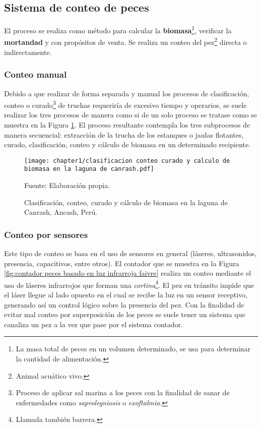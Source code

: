 \subsection{Sistema de conteo de peces}

El proceso se realiza como método para calcular la \textbf{biomasa}\footnote{La masa total de peces en un volumen determinado, se usa para determinar la cantidad de alimentación.}, verificar la \textbf{mortandad} y con propósitos de venta. Se realiza un conteo del pez\footnote{Animal acuático vivo.} directa o indirectamente. 

\subsubsection{Conteo manual}

Debido a que realizar de forma separada y manual los procesos de clasificación, conteo o curado\footnote{Proceso de aplicar sal marina a los peces con la finalidad de sanar de enfermedades como \textit{saprolegniosis} o \textit{exoftalmia}.}  de truchas requeriría de excesivo tiempo y operarios, se suele realizar los tres procesos de manera como si de un solo proceso se tratase como se muestra en la Figura \ref{fig:clasificacion conteo curado y calculo de biomasa en la laguna de canrash}. El proceso resultante contempla los tres subprocesos de manera secuencial: extracción de la trucha de los estanques o jaulas flotantes, curado, clasificación, conteo y cálculo de biomasa en un determinado recipiente.\\

\begin{figure}[H]
	\centering
	\texttt{[image: chapter1/clasificacion conteo curado y calculo de biomasa en la laguna de canrash.pdf]}
	\caption{Clasificación, conteo, curado y cálculo de biomasa en la laguna de Canrash, Ancash, Perú.}
	Fuente: Elaboración propia.
	\label{fig:clasificacion conteo curado y calculo de biomasa en la laguna de canrash}
\end{figure}

\subsubsection{Conteo por sensores}

Este tipo de conteo se basa en el uso de sensores en general (láseres, ultrasonidos, presencia, capacitivos, entre otros).  El contador que se muestra en la Figura \ref{fig:contador peces basado en luz infrarroja faivre} realiza un conteo mediante el uso de láseres infrarrojos que forman una \textit{cortina}\footnote{Llamada también barrera.}. El pez en tránsito impide que el láser llegue al lado opuesto en el cual se recibe la luz en un sensor receptivo, generando así un control lógico sobre la presencia del pez. Con la finalidad de evitar mal conteo por superposición de los peces se suele tener un sistema que canaliza un pez a la vez que pase por el sistema contador.

